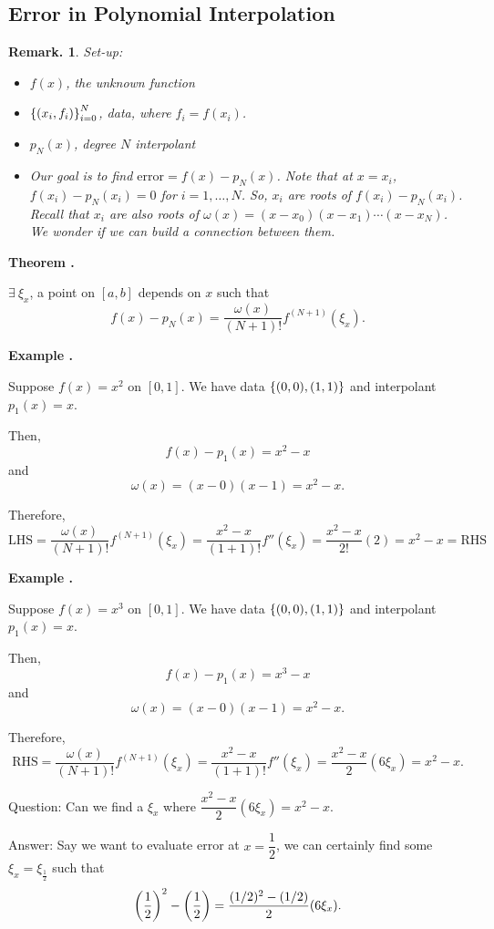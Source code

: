 \documentclass[12pt, a4paper]{article}
\newcounter{index}[subsection]
\newenvironment*{eg}[1]{\begin{framed}\par\noindent\textbf{Example \thesubsection.\stepcounter{index}\theindex\ #1} \par}{\par\end{framed}}
\newenvironment*{thm}[1]{\begin{tcolorbox}\par\noindent\textbf{Theorem \thesubsection.\stepcounter{index}\theindex\ #1} \par}{\par\end{tcolorbox}}
\newtheorem{rmk}{Remark.}[section]
\begin{document}
\subsection{Error in Polynomial Interpolation}
\begin{rmk} Set-up:
	\begin{itemize}
		\item $f(x)$, the unknown function
		\item $\qty{(x_i,f_i)}_{i=0}^N$, data, where $f_i=f(x_i)$.
		\item $p_N(x)$, degree $N$ interpolant
		\item Our goal is to find $\mathrm{error}=f(x)-p_N(x)$. Note that at $x=x_i$, $f(x_i)-p_N(x_i)=0$ for $i=1,\dots,N$. So, $x_i$ are roots of $f(x_i)-p_N(x_i)$. Recall that $x_i$ are also roots of $\omega(x)=(x-x_0)(x-x_1)\cdots(x-x_N)$. We wonder if we can build a connection between them.
	\end{itemize}	
\end{rmk}
\begin{thm}{}
	$\exists\ \xi_x$, a point on $[a,b]$ depends on $x$ such that \[f(x)-p_N(x)=\dfrac{\omega(x)}{(N+1)!}f^{(N+1)}(\xi_x).\]
\end{thm}
\begin{eg}{}
	Suppose $f(x)=x^2$ on $[0,1]$. We have data $\qty{(0,0), (1,1)}$ and interpolant $p_1(x)=x$.\par  Then, \[f(x)-p_1(x)=x^2-x\] and \[\omega(x)=(x-0)(x-1)=x^2-x.\]\par Therefore, \[\text{LHS}=\dfrac{\omega(x)}{(N+1)!}f^{(N+1)}(\xi_x)=\dfrac{x^2-x}{(1+1)!}f''(\xi_x)=\dfrac{x^2-x}{2!}(2)=x^2-x=\text{RHS}\]
\end{eg}
\begin{eg}{}
	Suppose $f(x)=x^3$ on $[0,1]$. We have data $\qty{(0,0), (1,1)}$ and interpolant $p_1(x)=x$.\par Then, \[f(x)-p_1(x)=x^3-x\] and \[\omega(x)=(x-0)(x-1)=x^2-x.\]\par Therefore, \[\text{RHS}=\dfrac{\omega(x)}{(N+1)!}f^{(N+1)}(\xi_x)=\dfrac{x^2-x}{(1+1)!}f''(\xi_x)=\dfrac{x^2-x}{2}(6\xi_x)=x^2-x.\]\par Question: Can we find a $\xi_x$ where $\dfrac{x^2-x}{2}(6\xi_x)=x^2-x$.\par Answer: Say we want to evaluate error at $x=\dfrac{1}{2}$, we can certainly find some $\xi_x=\xi_\frac{1}{2}$ such that \[\qty(\dfrac{1}{2})^2-\qty(\dfrac{1}{2})=\dfrac{(1/2)^2-(1/2)}{2}(6\xi_x).\]
\end{eg}
\end{document}

